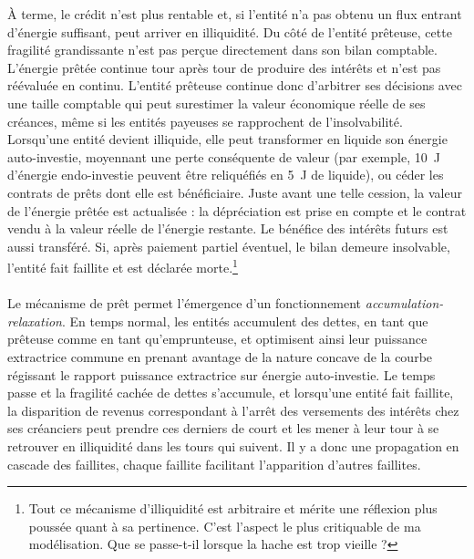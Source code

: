 \documentclass[10pt,a4paper]{article}
\begin{document}
À terme, le crédit n'est plus rentable et, si l'entité n'a pas obtenu un flux entrant d'énergie suffisant, peut arriver en illiquidité. Du côté de l'entité prêteuse, cette fragilité grandissante n'est pas perçue directement dans son bilan comptable. L'énergie prêtée continue tour après tour de produire des intérêts et n'est pas réévaluée en continu. L'entité prêteuse continue donc d'arbitrer ses décisions avec une taille comptable qui peut surestimer la valeur économique réelle de ses créances, même si les entités payeuses se rapprochent de l'insolvabilité. Lorsqu'une entité devient illiquide, elle peut transformer en liquide son énergie auto-investie, moyennant une perte conséquente de valeur (par exemple, \SI{10}{\joule} d'énergie endo-investie peuvent être reliquéfiés en \SI{5}{\joule} de liquide), ou céder les contrats de prêts dont elle est bénéficiaire. Juste avant une telle cession, la valeur de l'énergie prêtée est actualisée : la dépréciation est prise en compte et le contrat vendu à la valeur réelle de l'énergie restante. Le bénéfice des intérêts futurs est aussi transféré. Si, après paiement partiel éventuel, le bilan demeure insolvable, l'entité fait faillite et est déclarée morte.\footnote{Tout ce mécanisme d'illiquidité est arbitraire et mérite une réflexion plus poussée quant à sa pertinence. C'est l'aspect le plus critiquable de ma modélisation. Que se passe-t-il lorsque la hache est trop vieille ?}

\paragraph{}
Le mécanisme de prêt permet l'émergence d'un fonctionnement \textit{accumulation-relaxation}. En temps normal, les entités accumulent des dettes, en tant que prêteuse comme en tant qu'emprunteuse, et optimisent ainsi leur puissance extractrice commune en prenant avantage de la nature concave de la courbe régissant le rapport puissance extractrice sur énergie auto-investie. Le temps passe et la fragilité cachée de dettes s'accumule, et lorsqu'une entité fait faillite, la disparition de revenus correspondant à l'arrêt des versements des intérêts chez ses créanciers peut prendre ces derniers de court et les mener à leur tour à se retrouver en illiquidité dans les tours qui suivent. Il y a donc une propagation en cascade des faillites, chaque faillite facilitant l'apparition d'autres faillites.
\end{document}
